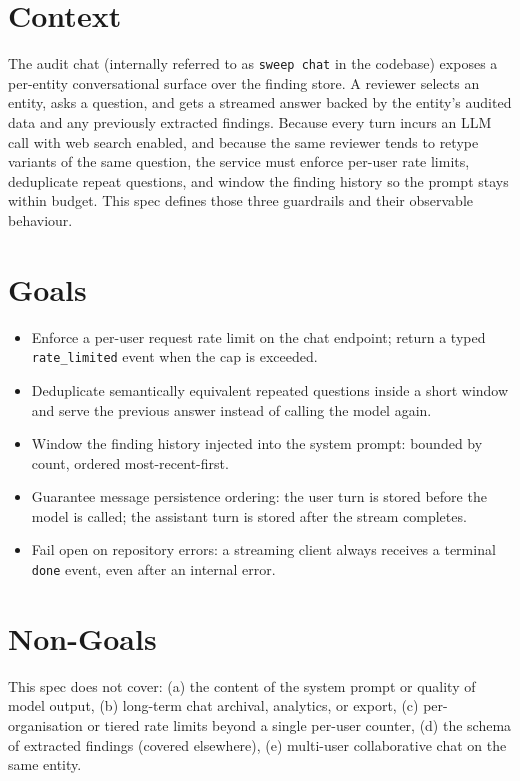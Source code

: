 



\makespecheader

\section{Context}
The audit chat (internally referred to as \texttt{sweep chat} in the codebase) exposes a
per-entity conversational surface over the finding store. A reviewer selects an entity, asks a
question, and gets a streamed answer backed by the entity's audited data and any previously
extracted findings. Because every turn incurs an LLM call with web search enabled, and because
the same reviewer tends to retype variants of the same question, the service must enforce
per-user rate limits, deduplicate repeat questions, and window the finding history so the prompt
stays within budget. This spec defines those three guardrails and their observable behaviour.

\section{Goals}
\begin{itemize}[leftmargin=1.2em]
  \item Enforce a per-user request rate limit on the chat endpoint; return a typed \texttt{rate\_limited} event when the cap is exceeded.
  \item Deduplicate semantically equivalent repeated questions inside a short window and serve the previous answer instead of calling the model again.
  \item Window the finding history injected into the system prompt: bounded by count, ordered most-recent-first.
  \item Guarantee message persistence ordering: the user turn is stored before the model is called; the assistant turn is stored after the stream completes.
  \item Fail open on repository errors: a streaming client always receives a terminal \texttt{done} event, even after an internal error.
\end{itemize}

\section{Non-Goals}
\begin{nongoal}
This spec does not cover: (a) the content of the system prompt or quality of model output,
(b) long-term chat archival, analytics, or export, (c) per-organisation or tiered rate limits
beyond a single per-user counter, (d) the schema of extracted findings (covered elsewhere),
(e) multi-user collaborative chat on the same entity.
\end{nongoal}


